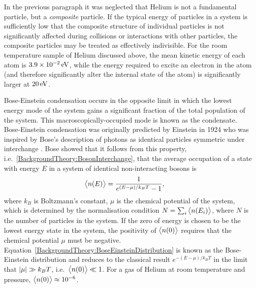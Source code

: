 In the previous paragraph it was neglected that Helium is not a fundamental particle, but a \emph{composite} particle.  If the typical energy of particles in a system is sufficiently low that the composite structure of individual particles is not significantly affected during collisions or interactions with other particles, the composite particles may be treated as effectively indivisible.  For the room temperature sample of Helium discussed above, the mean kinetic energy of each atom is $3.9\times\unit[10^{-2}]{eV}$, while the energy required to excite an electron in the atom (and therefore significantly alter the internal state of the atom) is significantly larger at $\unit[20]{eV}$.

Bose-Einstein condensation occurs in the opposite limit in which the lowest energy mode of the system gains a significant fraction of the total population of the system.  This macroscopically-occupied mode is known as the condensate.  Bose-Einstein condensation was originally predicted by Einstein \citep{Einstein:1924,Einstein:1925} in 1924 who was inspired by Bose's description of photons as identical particles symmetric under interchange \citep{Bose:1924}.  Bose showed that it follows from this property, i.e.\ \eqref{BackgroundTheory:BosonInterchange}, that the average occupation of a state with energy $E$ in a system of identical non-interacting bosons is
\begin{align}
    \mean{n(E)} &= \frac{1}{e^{(E - \mu)/k_B T} - 1}, \label{BackgroundTheory:BoseEinsteinDistribution}
\end{align}
where $k_B$ is Boltzmann's constant, $\mu$ is the chemical potential of the system, which is determined by the normalisation condition $N = \sum_i {\big<n(E_i)\big>}$, where $N$ is the number of particles in the system.  If the zero of energy is chosen to be the lowest energy state in the system, the positivity of ${\big<n(0)\big>}$ requires that the chemical potential $\mu$ must be negative.  Equation~\eqref{BackgroundTheory:BoseEinsteinDistribution} is known as the Bose-Einstein distribution and reduces to the classical result $e^{-(E - \mu)/k_B T}$ in the limit that $\left|\mu\right| \gg k_B T$, i.e.\ ${\big<n(0)\big>} \ll 1$.  For a gas of Helium at room temperature and pressure, ${\big<n(0)\big>} \approx 10^{-6}$.

